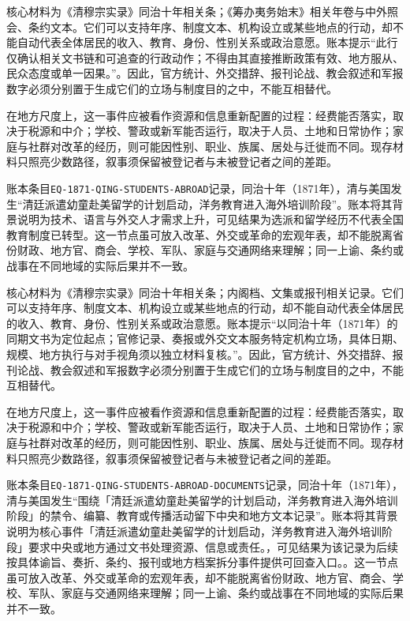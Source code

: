 核心材料为《清穆宗实录》同治十年相关条；《筹办夷务始末》相关年卷与中外照会、条约文本。它们可以支持年序、制度文本、机构设立或某些地点的行动，却不能自动代表全体居民的收入、教育、身份、性别关系或政治意愿。账本提示“此行仅确认相关文书链和可追查的行政动作；不得由其直接推断政策有效、地方服从、民众态度或单一因果。”。因此，官方统计、外交措辞、报刊论战、教会叙述和军报数字必须分别置于生成它们的立场与制度目的之中，不能互相替代。

在地方尺度上，这一事件应被看作资源和信息重新配置的过程：经费能否落实，取决于税源和中介；学校、警政或新军能否运行，取决于人员、土地和日常协作；家庭与社群对改革的经历，则可能因性别、职业、族属、居处与迁徙而不同。现存材料只照亮少数路径，叙事须保留被登记者与未被登记者之间的差距。

账本条目\texttt{EQ-1871-QING-STUDENTS-ABROAD}记录，同治十年（1871年），清与美国发生“清廷派遣幼童赴美留学的计划启动，洋务教育进入海外培训阶段”。账本将其背景说明为技术、语言与外交人才需求上升，可见结果为选派和留学经历不代表全国教育制度已转型。这一节点虽可放入改革、外交或革命的宏观年表，却不能脱离省份财政、地方官、商会、学校、军队、家庭与交通网络来理解；同一上谕、条约或战事在不同地域的实际后果并不一致。

核心材料为《清穆宗实录》同治十年相关条；内阁档、文集或报刊相关记录。它们可以支持年序、制度文本、机构设立或某些地点的行动，却不能自动代表全体居民的收入、教育、身份、性别关系或政治意愿。账本提示“以同治十年（1871年）的同期文书为定位起点；官修记录、奏报或外交文本服务特定机构立场，具体日期、规模、地方执行与对手视角须以独立材料复核。”。因此，官方统计、外交措辞、报刊论战、教会叙述和军报数字必须分别置于生成它们的立场与制度目的之中，不能互相替代。

在地方尺度上，这一事件应被看作资源和信息重新配置的过程：经费能否落实，取决于税源和中介；学校、警政或新军能否运行，取决于人员、土地和日常协作；家庭与社群对改革的经历，则可能因性别、职业、族属、居处与迁徙而不同。现存材料只照亮少数路径，叙事须保留被登记者与未被登记者之间的差距。

账本条目\texttt{EQ-1871-QING-STUDENTS-ABROAD-DOCUMENTS}记录，同治十年（1871年），清与美国发生“围绕「清廷派遣幼童赴美留学的计划启动，洋务教育进入海外培训阶段」的禁令、编纂、教育或传播活动留下中央和地方文本记录”。账本将其背景说明为核心事件「清廷派遣幼童赴美留学的计划启动，洋务教育进入海外培训阶段」要求中央或地方通过文书处理资源、信息或责任。，可见结果为该记录为后续按具体谕旨、奏折、条约、报刊或地方档案拆分事件提供可回查入口。。这一节点虽可放入改革、外交或革命的宏观年表，却不能脱离省份财政、地方官、商会、学校、军队、家庭与交通网络来理解；同一上谕、条约或战事在不同地域的实际后果并不一致。

